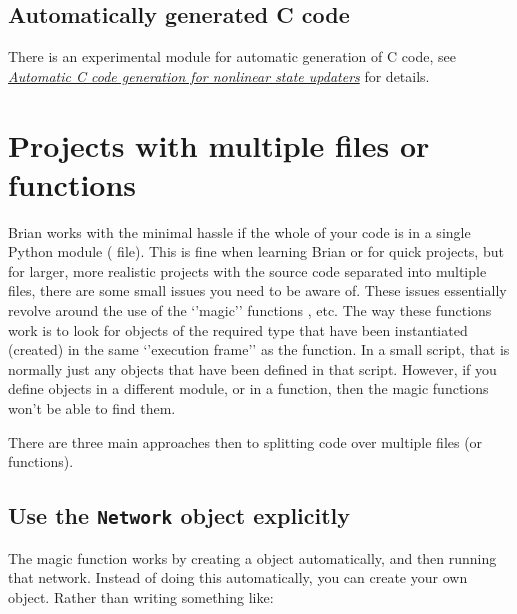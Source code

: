 \documentclass[letterpaper,10pt,english]{manual}
\begin{document}
\subsection{Automatically generated C code}

There is an experimental module for automatic generation of C code, see \hyperlink{ccodegen}{\emph{Automatic C code generation for nonlinear state updaters}} for details.

\resetcurrentobjects
\hypertarget{--doc-tasks_multiplefiles}{}

\hypertarget{projects-with-multiple-files}{}\section{Projects with multiple files or functions}

Brian works with the minimal hassle if the whole of your code is in a
single Python module ( file). This is fine when learning Brian
or for quick projects, but for larger, more realistic projects with
the source code separated into multiple files, there are some small
issues you need to be aware of. These issues essentially revolve
around the use of the `'magic'' functions \hyperlink{brian.run}{}, etc. The way
these functions work is to look for objects of the required type that
have been instantiated (created) in the same `'execution frame'' as
the \hyperlink{brian.run}{} function. In a small script, that is normally just
any objects that have been defined in that script. However, if you
define objects in a different module, or in a function, then the
magic functions won't be able to find them.

There are three main approaches then to splitting code over multiple
files (or functions).

\hypertarget{index-120}{}\subsection{Use the \texttt{Network} object explicitly}

The magic \hyperlink{brian.run}{} function works by creating a \hyperlink{brian.Network}{}
object automatically, and then running that network. Instead of doing
this automatically, you can create your own \hyperlink{brian.Network}{} object.
Rather than writing something like:
\end{document}
